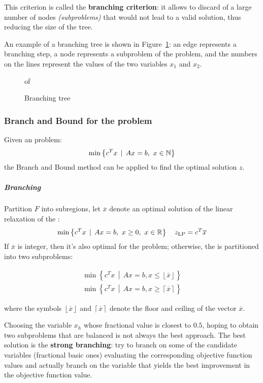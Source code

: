 \documentclass[english]{article}
\begin{document}
This criterion is called the \textbf{branching criterion}: it allows to discard of a large number of nodes \textit{(subproblems)} that would not lead to a valid solution, thus reducing the size of the tree.

\bigskip
An example of a branching tree is shown in Figure~\ref{fig:branching-tree}: an edge represents a branching step, a node represents a subproblem of the \ILP problem, and the numbers on the lines represent the values of the two variables \(x_1\) and \(x_2\).

\begin{figure}[htbp]of
  \centering
  \bigskip
  \caption{Branching tree}
  \label{fig:branching-tree}
  \bigskip
\end{figure}

\subsubsection{Branch and Bound for the \ILP problem}

Given an \ILP problem:
\[ \min\left\{ c^T x \,\mid\, Ax = b, \ x \in \mathbb{N} \right\} \]
the Branch and Bound method can be applied to find the optimal solution \(z\).

\subparagraph*{Branching}

Partition \(F\) into subregions, let \(\overline{x}\) denote an optimal solution of the linear relaxation of the \ILP:
\[ \min\left\{ c^T x \,\mid\, Ax = b, \ x \geq 0, \ x \in \R \right\} \quad z_{\text{LP}} = c^T \overline{x} \]
If \(\overline{x}\) is integer, then it's also optimal for the \ILP problem;
otherwise, the \ILP is partitioned into two subproblems:

\begin{gather}
  \min\left\{ c^T x \,\middle\vert\, Ax = b, x \leq \left\lfloor \overline{x} \right\rfloor \right\} \label{eq:branch1}\tag{ILP 1} \\
  \min\left\{ c^T x \,\middle\vert\, Ax = b, x \geq \left\lceil \overline{x} \right\rceil \right\} \label{eq:branch2}\tag{ILP 2}
\end{gather}

where the symbols \( \left\lfloor \overline{x} \right\rfloor \) and \( \left\lceil \overline{x} \right\rceil \) denote the floor and ceiling of the vector \(\overline{x}\).

\bigskip
Choosing the variable \(x_h\) whose fractional value is closest to \(0.5\), hoping to obtain two subproblems that are balanced is not always the best approach.
The best solution is the \textbf{strong branching}:
try to branch on some of the candidate variables (fractional basic ones) evaluating the corresponding objective function values and actually branch on the variable that yields the best improvement in the objective function value.
\end{document}
